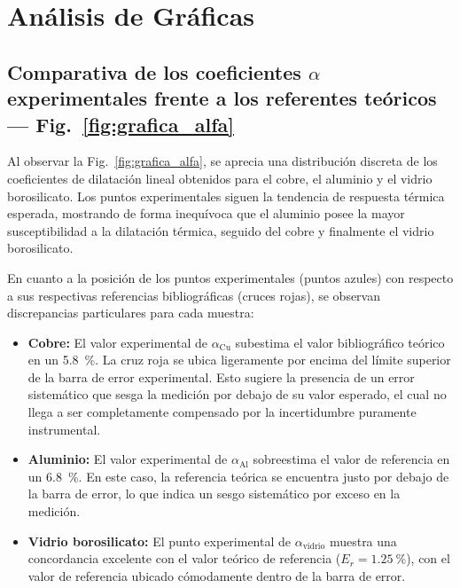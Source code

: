 
\section{Análisis de Gráficas}
\label{sec:analisis_graficas}

\subsection{Comparativa de los coeficientes \texorpdfstring{$\alpha$}{alpha} experimentales frente a los referentes teóricos --- Fig.~\ref{fig:grafica_alfa}}

Al observar la Fig.~\ref{fig:grafica_alfa}, se aprecia una distribución discreta de los coeficientes de dilatación lineal obtenidos para el cobre, el aluminio y el vidrio borosilicato. Los puntos experimentales siguen la tendencia de respuesta térmica esperada, mostrando de forma inequívoca que el aluminio posee la mayor susceptibilidad a la dilatación térmica, seguido del cobre y finalmente el vidrio borosilicato.

En cuanto a la posición de los puntos experimentales (puntos azules) con respecto a sus respectivas referencias bibliográficas (cruces rojas), se observan discrepancias particulares para cada muestra:
\begin{itemize}
    \item \textbf{Cobre:} El valor experimental de $\alpha_{\text{Cu}}$ subestima el valor bibliográfico teórico en un \qty{5,8}{\percent}. La cruz roja se ubica ligeramente por encima del límite superior de la barra de error experimental. Esto sugiere la presencia de un error sistemático que sesga la medición por debajo de su valor esperado, el cual no llega a ser completamente compensado por la incertidumbre puramente instrumental.
    \item \textbf{Aluminio:} El valor experimental de $\alpha_{\text{Al}}$ sobreestima el valor de referencia en un \qty{6,8}{\percent}. En este caso, la referencia teórica se encuentra justo por debajo de la barra de error, lo que indica un sesgo sistemático por exceso en la medición.
    \item \textbf{Vidrio borosilicato:} El punto experimental de $\alpha_{\text{vidrio}}$ muestra una concordancia excelente con el valor teórico de referencia ($E_r = \qty{1,25}{\percent}$), con el valor de referencia ubicado cómodamente dentro de la barra de error.
\end{itemize}

